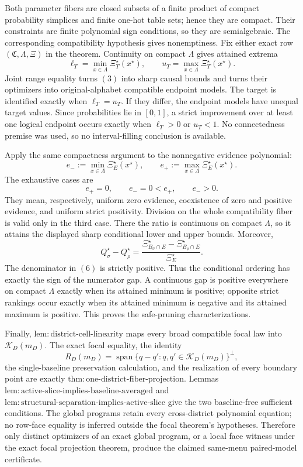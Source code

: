 Both parameter fibers are closed subsets of a finite product of compact probability
simplices and finite one-hot table sets; hence they are compact.  Their constraints
are finite polynomial sign conditions, so they are semialgebraic.  The corresponding
compatibility hypothesis gives nonemptiness.  Fix either exact row
\((\mathfrak C,\Lambda,\Xi)\) in the theorem.  Continuity on compact \(\Lambda\)
gives attained extrema
\[
\ell_T=\min_{x\in\Lambda}\Xi_T^\star(x^\star),
\qquad
u_T=\max_{x\in\Lambda}\Xi_T^\star(x^\star).
\tag{3}
\]
Joint range equality turns \((3)\) into sharp causal bounds and turns their
optimizers into original-alphabet compatible endpoint models.  The target is
identified exactly when \(\ell_T=u_T\).  If they differ, the endpoint models have
unequal target values.  Since probabilities lie in \([0,1]\), a strict improvement
over at least one logical endpoint occurs exactly when \(\ell_T>0\) or \(u_T<1\).
No connectedness premise was used, so no interval-filling conclusion is available.

Apply the same compactness argument to the nonnegative evidence polynomial:
\[
e_-:=\min_{x\in\Lambda}\Xi_E^\star(x^\star),
\qquad
e_+:=\max_{x\in\Lambda}\Xi_E^\star(x^\star).
\tag{4}
\]
The exhaustive cases are
\[
e_+=0,
\qquad
e_-=0<e_+,
\qquad
e_->0.
\tag{5}
\]
They mean, respectively, uniform zero evidence, coexistence of zero and positive
evidence, and uniform strict positivity.  Division on the whole compatibility fiber
is valid only in the third case.  There the ratio is continuous on compact
\(\Lambda\), so it attains the displayed sharp conditional lower and upper bounds.
Moreover,
\[
Q_\sigma^\star-Q_\rho^\star
=\frac{\Xi_{B_\sigma\cap E}^\star-
\Xi_{B_\rho\cap E}^\star}{\Xi_E^\star}.
\tag{6}
\]
The denominator in \((6)\) is strictly positive.  Thus the conditional ordering has
exactly the sign of the numerator gap.  A continuous gap is positive everywhere on
compact \(\Lambda\) exactly when its attained minimum is positive; opposite strict
rankings occur exactly when its attained minimum is negative and its attained
maximum is positive.  This proves the safe-pruning characterizations.

Finally, \(\mathrm{lem:district\text{-}cell\text{-}linearity}\) maps every broad
compatible focal law into \(\mathcal K_D(m_D)\).  The exact focal equality, the
identity
\[
R_D(m_D)=
\operatorname{span}\{q-q':q,q'\in\mathcal K_D(m_D)\}^{\perp},
\tag{7}
\]
the single-baseline preservation calculation, and the realization of every boundary
point are exactly
\(\mathrm{thm:one\text{-}district\text{-}fiber\text{-}projection}\).  Lemmas
\(\mathrm{lem:active\text{-}slice\text{-}implies\text{-}baseline\text{-}averaged}\)
and
\(\mathrm{lem:structural\text{-}separation\text{-}implies\text{-}active\text{-}slice}\)
give the two baseline-free sufficient conditions.  The global programs retain every
cross-district polynomial equation; no row-face equality is inferred outside the
focal theorem's hypotheses.  Therefore only distinct optimizers of an exact global
program, or a local face witness under the exact focal projection theorem, produce
the claimed same-menu paired-model certificate.